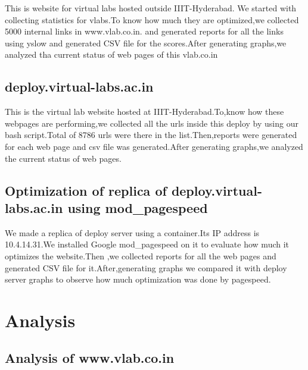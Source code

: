 \documentclass[11pt]{article}
\begin{document}
This is website for virtual labs hosted outside IIIT-Hyderabad.
We started with collecting statistics for vlabs.To know how much they are optimized,we collected 5000 internal links in www.vlab.co.in. and generated reports for all the links using yslow and generated CSV file for the scores.After generating graphs,we analyzed tha current status of web pages of this vlab.co.in

\subsection{deploy.virtual-labs.ac.in}
\label{sec-5.2}

This is the virtual lab website hosted at IIIT-Hyderabad.To,know how these webpages are performing,we collected all the urls inside this deploy by using our bash script.Total of 8786 urls were there in the list.Then,reports were generated for each web page and  csv file was generated.After generating graphs,we analyzed the current status of web pages.

\subsection{Optimization of replica of deploy.virtual-labs.ac.in using mod\_pagespeed}
\label{sec-5.3}

   We made a replica of deploy server using a container.Its IP address is 10.4.14.31.We installed Google mod\_pagespeed on it to evaluate how much it optimizes the website.Then ,we collected reports for all the web pages and generated CSV file for it.After,generating graphs we compared it with deploy server graphs to observe how much optimization was done by pagespeed.
\section{Analysis}
\label{sec-6}

\subsection{Analysis of www.vlab.co.in}
\label{sec-6.1}
\end{document}
